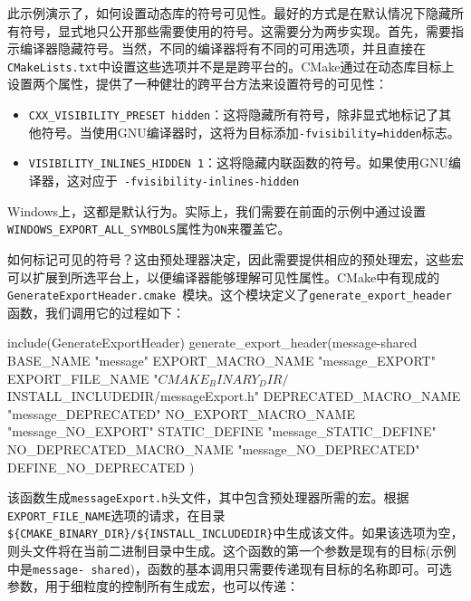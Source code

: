 
此示例演示了，如何设置动态库的符号可见性。最好的方式是在默认情况下隐藏所有符号，显式地只公开那些需要使用的符号。这需要分为两步实现。首先，需要指示编译器隐藏符号。当然，不同的编译器将有不同的可用选项，并且直接在\texttt{CMakeLists.txt}中设置这些选项并不是是跨平台的。CMake通过在动态库目标上设置两个属性，提供了一种健壮的跨平台方法来设置符号的可见性：

\begin{itemize}
\item \texttt{CXX\_VISIBILITY\_PRESET hidden}：这将隐藏所有符号，除非显式地标记了其他符号。当使用GNU编译器时，这将为目标添加\texttt{-fvisibility=hidden}标志。

\item \texttt{VISIBILITY\_INLINES\_HIDDEN 1}：这将隐藏内联函数的符号。如果使用GNU编译器，这对应于\texttt{ -fvisibility-inlines-hidden }

\end{itemize}

Windows上，这都是默认行为。实际上，我们需要在前面的示例中通过设置\texttt{WINDOWS\_EXPORT\_ALL\_SYMBOLS}属性为\texttt{ON}来覆盖它。

如何标记可见的符号？这由预处理器决定，因此需要提供相应的预处理宏，这些宏可以扩展到所选平台上，以便编译器能够理解可见性属性。CMake中有现成的\texttt{GenerateExportHeader.cmake }模块。这个模块定义了\texttt{generate\_export\_header}函数，我们调用它的过程如下：

\begin{codebox}[cmake]
include(GenerateExportHeader)
generate_export_header(message-shared
  BASE_NAME "message"
  EXPORT_MACRO_NAME "message_EXPORT"
  EXPORT_FILE_NAME "${CMAKE_BINARY_DIR}/${INSTALL_INCLUDEDIR}/messageExport.h"
  DEPRECATED_MACRO_NAME "message_DEPRECATED"
  NO_EXPORT_MACRO_NAME "message_NO_EXPORT"
  STATIC_DEFINE "message_STATIC_DEFINE"
  NO_DEPRECATED_MACRO_NAME "message_NO_DEPRECATED"
  DEFINE_NO_DEPRECATED
  )
\end{codebox}

该函数生成\texttt{messageExport.h}头文件，其中包含预处理器所需的宏。根据\texttt{EXPORT\_FILE\_NAME}选项的请求，在目录\texttt{\$\{CMAKE\_BINARY\_DIR\}/\$\{INSTALL\_INCLUDEDIR\}}中生成该文件。如果该选项为空，则头文件将在当前二进制目录中生成。这个函数的第一个参数是现有的目标(示例中是\texttt{message- shared})，函数的基本调用只需要传递现有目标的名称即可。可选参数，用于细粒度的控制所有生成宏，也可以传递：

